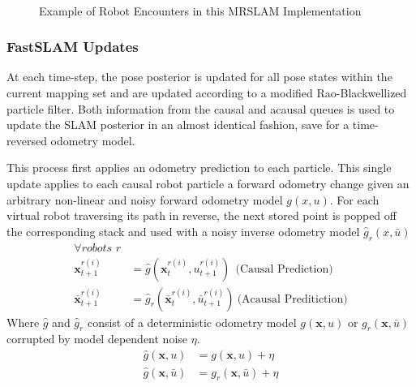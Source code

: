 \begin{figure}[ht!]
     \\
\caption{Example of Robot Encounters in this MRSLAM Implementation}
\label{fig:multiencounter}
\end{figure}

\vspace{0.1in}
\subsubsection{FastSLAM Updates}
At each time-step, the pose posterior is updated for all pose states within the current mapping set and are updated according to a modified Rao-Blackwellized particle filter. Both information from the causal and acausal queues is used to update the SLAM posterior in an almost identical fashion, save for a time-reversed odometry model. 

This process first applies an odometry prediction to each particle. This single update applies to each causal robot particle a forward odometry change given an arbitrary non-linear and noisy forward odometry model $g(x,u)$. For each virtual robot traversing its path in reverse, the next stored point is popped off the corresponding stack and used with a noisy inverse odometry model $\hat{g}_r(x,\bar{u})$
\begin{align*}
\forall \textit{robots $r$} \\
\textbf{x}_{t+1}^{r(i)} &= \hat{g}(\textbf{x}_{t}^{r(i)},u_{t+1}^{r(i)})~~\text{(Causal Prediction)}\\
\bar{\textbf{x}}_{t+1}^{r(i)} &= \hat{g}_r(\bar{\textbf{x}}_t^{r(i)}, \bar{u}_{t+1}^{r(i)}) ~\text{(Acausal Preditiction)}
\end{align*}
Where $\hat{g}$ and $\hat{g}_r$ consist of a deterministic odometry model $g(\textbf{x},u)$ or $g_r(\textbf{x},\bar{u})$ corrupted by model dependent noise $\eta$.
\begin{align}
\hat{g}(\textbf{x},u)&=g(\textbf{x},u)+\eta\\
\hat{g}(\textbf{x},\bar{u})&=g_r(\textbf{x},\bar{u})+\eta
\end{align}

